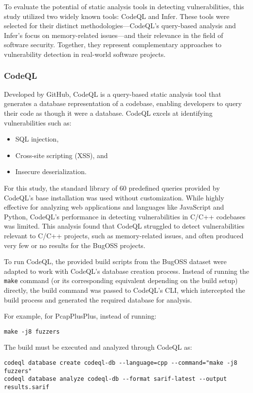 To evaluate the potential of static analysis tools in detecting vulnerabilities, this study utilized two widely known tools: CodeQL and Infer. These tools were selected for their distinct methodologies—CodeQL's query-based analysis and Infer's focus on memory-related issues—and their relevance in the field of software security. Together, they represent complementary approaches to vulnerability detection in real-world software projects.

\subsubsection{CodeQL}
Developed by GitHub, CodeQL is a query-based static analysis tool that generates a database representation of a codebase, enabling developers to query their code as though it were a database. CodeQL excels at identifying vulnerabilities such as:
\begin{itemize}
    \item SQL injection,
    \item Cross-site scripting (XSS), and
    \item Insecure deserialization.
\end{itemize}

For this study, the standard library of 60 predefined queries provided by CodeQL's base installation was used without customization. While highly effective for analyzing web applications and languages like JavaScript and Python, CodeQL's performance in detecting vulnerabilities in C/C++ codebases was limited. This analysis found that CodeQL struggled to detect vulnerabilities relevant to C/C++ projects, such as memory-related issues, and often produced very few or no results for the BugOSS projects.

To run CodeQL, the provided build scripts from the BugOSS dataset were adapted to work with CodeQL's database creation process. Instead of running the \texttt{make} command (or its corresponding equivalent depending on the build setup) directly, the build command was passed to CodeQL's CLI, which intercepted the build process and generated the required database for analysis.

For example, for PcapPlusPlus, instead of running:
\begin{verbatim}
make -j8 fuzzers
\end{verbatim}

The build must be executed and analyzed through CodeQL as:
\begin{verbatim}
codeql database create codeql-db --language=cpp --command="make -j8 fuzzers"
codeql database analyze codeql-db --format sarif-latest --output results.sarif
\end{verbatim}

